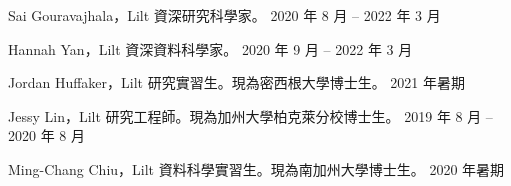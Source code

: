 
Sai Gouravajhala，Lilt 資深研究科學家。 \hfill 2020 年 8 月 -- 2022 年 3 月

Hannah Yan，Lilt 資深資料科學家。 \hfill 2020 年 9 月 -- 2022 年 3 月

Jordan Huffaker，Lilt 研究實習生。現為密西根大學博士生。 \hfill 2021 年暑期

Jessy Lin，Lilt 研究工程師。現為加州大學柏克萊分校博士生。 \hfill 2019 年 8 月 -- 2020 年 8 月

Ming-Chang Chiu，Lilt 資料科學實習生。現為南加州大學博士生。 \hfill 2020 年暑期\\





